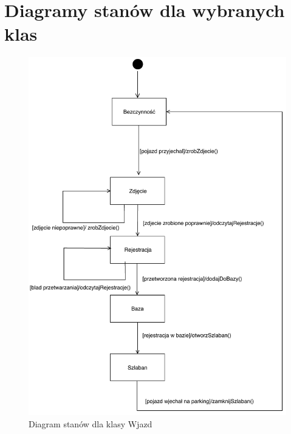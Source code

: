 \section{Diagramy stanów dla wybranych klas}
\label{sec:diagStanow}
\begin{figure}[H]
	\centering
	\includegraphics[width=130mm]{diagramy/DiagStanowWjazd.pdf}
	\caption{Diagram stanów dla klasy Wjazd \label{overflow}}
\end{figure}
